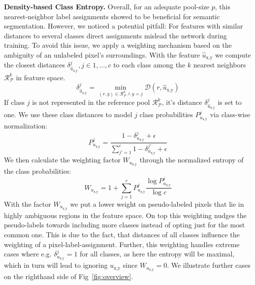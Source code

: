 \documentclass[letterpaper]{article} %
\begin{document}
\noindent\textbf{Density-based Class Entropy.}
Overall, for an adequate pool-size $p$, this nearest-neighbor label assignments showed to be beneficial for semantic segmentation.
However, we noticed a potential pitfall: For features with similar distances to several classes direct assignments mislead the network during training.
To avoid this issue, we apply a weighting mechanism based on the ambiguity of an unlabeled pixel's surroundings.
With the feature $\hat u_{\text{x},\text{y}}$ we compute the closest distances $\delta^j_{\hat u_{\text{x},\text{y}}}, j\in {1,\dots,c}$ to each class among the $k$ nearest neighbors $\mathcal{R}_\mathcal{\mathcal{P}}^k$ in feature space.
\begin{equation}\label{eq:dist_entr}
    \delta^j_{\hat u_{\text{x},\text{y}}} =
        \min_{(r,y) \in \mathcal{R}_\mathcal{P}^k\land y=j} \mathcal{D}(r, \hat u_{\text{x},\text{y}})
\end{equation}
If class $j$ is not represented in the reference pool $\mathcal{R}_\mathcal{P}^k$, it's distance $\delta^j_{\hat u_{\text{x},\text{y}}}$ is set to one.
We use these class distances to model $j$ class probabilities $\mathit{P}^j_{u_{\text{x},\text{y}}}$ via class-wise normalization:
\begin{equation}\label{eq:class_prob}
    \mathit{P}^j_{u_{\text{x},\text{y}}} = \frac{1- \delta^j_{u_{\text{x},\text{y}}}+\epsilon}{\sum_{j'=1}^c 1- \delta^{j'}_{u_{\text{x},\text{y}}}+\epsilon}
\end{equation}
We then calculate the weighting factor $W_{u_{\text{x},\text{y}}}$ through the normalized entropy of the class probabilities:
\begin{equation}\label{eq:entropy}
    W_{u_{\text{x},\text{y}}} = 1 + \sum^c_{j=1} \mathit{P}^j_{u_{\text{x},\text{y}}} \frac{\log \mathit{P}^j_{u_{\text{x},\text{y}}}}{\log c}
\end{equation}
With the factor $W_{u_{\text{x},\text{y}}}$ we put a lower weight on pseudo-labeled pixels that lie in highly ambiguous regions in the feature space.
On top this weighting nudges the pseudo-labels towards including more classes instead of opting just for the most common one.
This is due to the fact, that distances of all classes influence the weighting of a pixel-label-assignment.
Further, this weighting handles extreme cases where e.g.  $\delta^j_{u_{\text{x},\text{y}}} = 1$ for all classes, as here the entropy will be maximal, which in turn will lead to ignoring $u_{\text{x},\text{y}}$ since $W_{u_{\text{x},\text{y}}} = 0$.
We illustrate further cases on the righthand side of Fig~\ref{fig:overview}.
\end{document}
